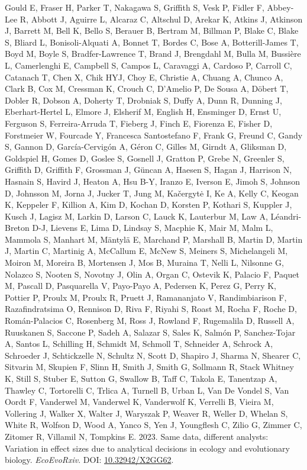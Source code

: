 \documentclass[10pt,a4paper]{article}
\newlength{\cslhangindent}
\newlength{\cslentryspacingunit} %
\newenvironment{CSLReferences}[2] %
 {%
  \setlength{\parindent}{0pt}
  \ifodd #1
  \let\oldpar\par
  \def\par{\hangindent=\cslhangindent\oldpar}
  \fi
  \setlength{\parskip}{#2\cslentryspacingunit}
 }%
 {}
\begin{document}
\begin{CSLReferences}{1}{0}
\leavevmode{}%
Gould E, Fraser H, Parker T, Nakagawa S, Griffith S, Vesk P, Fidler F, Abbey-Lee R, Abbott J, Aguirre L, Alcaraz C, Altschul D, Arekar K, Atkins J, Atkinson J, Barrett M, Bell K, Bello S, Berauer B, Bertram M, Billman P, Blake C, Blake S, Bliard L, Bonisoli-Alquati A, Bonnet T, Bordes C, Bose A, Botterill-James T, Boyd M, Boyle S, Bradfer-Lawrence T, Brand J, Brengdahl M, Bulla M, Bussière L, Camerlenghi E, Campbell S, Campos L, Caravaggi A, Cardoso P, Carroll C, Catanach T, Chen X, Chik HYJ, Choy E, Christie A, Chuang A, Chunco A, Clark B, Cox M, Cressman K, Crouch C, D'Amelio P, De Sousa A, Döbert T, Dobler R, Dobson A, Doherty T, Drobniak S, Duffy A, Dunn R, Dunning J, Eberhart-Hertel L, Elmore J, Elsherif M, English H, Ensminger D, Ernst U, Ferguson S, Ferreira-Arruda T, Fieberg J, Finch E, Fiorenza E, Fisher D, Forstmeier W, Fourcade Y, Francesca Santostefano F, Frank G, Freund C, Gandy S, Gannon D, García-Cervigón A, Géron C, Gilles M, Girndt A, Gliksman D, Goldspiel H, Gomes D, Goslee S, Gosnell J, Gratton P, Grebe N, Greenler S, Griffith D, Griffith F, Grossman J, Güncan A, Haesen S, Hagan J, Harrison N, Hasnain S, Havird J, Heaton A, Hsu B-Y, Iranzo E, Iverson E, Jimoh S, Johnson D, Johnsson M, Jorna J, Jucker T, Jung M, Kačergytė I, Ke A, Kelly C, Keogan K, Keppeler F, Killion A, Kim D, Kochan D, Korsten P, Kothari S, Kuppler J, Kusch J, Lagisz M, Larkin D, Larson C, Lauck K, Lauterbur M, Law A, Léandri-Breton D-J, Lievens E, Lima D, Lindsay S, Macphie K, Mair M, Malm L, Mammola S, Manhart M, Mäntylä E, Marchand P, Marshall B, Martin D, Martin J, Martin C, Martinig A, McCallum E, McNew S, Meiners S, Michelangeli M, Moiron M, Moreira B, Mortensen J, Mos B, Muraina T, Nelli L, Nilsonne G, Nolazco S, Nooten S, Novotny J, Olin A, Organ C, Ostevik K, Palacio F, Paquet M, Pascall D, Pasquarella V, Payo-Payo A, Pedersen K, Perez G, Perry K, Pottier P, Proulx M, Proulx R, Pruett J, Ramananjato V, Randimbiarison F, Razafindratsima O, Rennison D, Riva F, Riyahi S, Roast M, Rocha F, Roche D, Román-Palacios C, Rosenberg M, Ross J, Rowland F, Rugemalila D, Russell A, Ruuskanen S, Saccone P, Sadeh A, Salazar S, Sales K, Salmón P, Sanchez-Tojar A, Santos L, Schilling H, Schmidt M, Schmoll T, Schneider A, Schrock A, Schroeder J, Schtickzelle N, Schultz N, Scott D, Shapiro J, Sharma N, Shearer C, Sitvarin M, Skupien F, Slinn H, Smith J, Smith G, Sollmann R, Stack Whitney K, Still S, Stuber E, Sutton G, Swallow B, Taff C, Takola E, Tanentzap A, Thawley C, Tortorelli C, Trlica A, Turnell B, Urban L, Van De Vondel S, Van Oordt F, Vanderwel M, Vanderwel K, Vanderwolf K, Verrelli B, Vieira M, Vollering J, Walker X, Walter J, Waryszak P, Weaver R, Weller D, Whelan S, White R, Wolfson D, Wood A, Yanco S, Yen J, Youngflesh C, Zilio G, Zimmer C, Zitomer R, Villamil N, Tompkins E. 2023. Same data, different analysts: Variation in effect sizes due to analytical decisions in ecology and evolutionary biology. \emph{EcoEvoRxiv}. DOI: \href{https://doi.org/10.32942/X2GG62}{10.32942/X2GG62}.


\end{CSLReferences}
\end{document}
